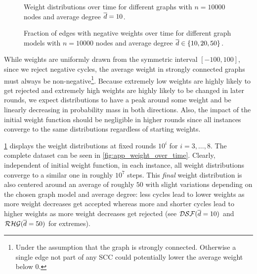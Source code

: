 \begin{figure}[!tb]
  \centering
  \caption{
    Weight distributions over time for different graphs with $n = 10000$ nodes and average degree $\overline{d} = 10$. 
  }
  \label{fig:dist_over_time}
\end{figure}

\begin{figure}[!tb]
  \centering
  \caption{
    Fraction of edges with negative weights over time for different graph models with $n = 10000$ nodes and average degree $\overline{d} \in \left\{10, 20, 50\right\}$.
  }
  \label{fig:neg_edges}
\end{figure}


While weights are uniformly drawn from the symmetric interval $[-100,100]$, since we reject negative cycles, the average weight in strongly connected graphs must always be non-negative\footnote{
  Under the assumption that the graph is strongly connected. 
  Otherwise a single edge not part of any SCC could potentially lower the average weight below $0$.
}.
Because extremely low weights are highly likely to get rejected and extremely high weights are highly likely to be changed in later rounds, we expect distributions to have a peak around some weight and be linearly decreasing in probability mass in both directions.
Also, the impact of the initial weight function should be negligible in higher rounds since all instances converge to the same distributions regardless of starting weights.

\cref{fig:dist_over_time} displays the weight distributions at fixed rounds $10^i$ for $i = 3,\ldots,8$.
The complete dataset can be seen in \cref{fig:app_weight_over_time}.
Clearly, independent of initial weight function, in each instance, all weight distributions converge to a similar one in roughly $10^7$ steps.
This \emph{final} weight distribution is also centered around an average of roughly $50$ with slight variations depending on the chosen graph model and average degree: less cycles lead to lower weights as more weight decreases get accepted whereas more and shorter cycles lead to higher weights as more weight decreases get rejected (see $\mathcal{DSF}(\overline{d} = 10)$ and $\mathcal{RHG}(\overline{d} = 50)$ for extremes).


